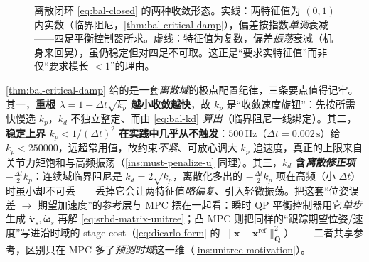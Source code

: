 \begin{figure}[ht]
\centering
{}
\caption{离散闭环 \cref{eq:bal-closed} 的两种收敛形态。实线：两特征值为 $(0,1)$ 内实数（临界阻尼，\cref{thm:bal-critical-damp}），偏差按指数\emph{单调}衰减——四足平衡控制器所求。虚线：特征值为复数，偏差\emph{振荡}衰减（机身来回晃），虽仍稳定但对四足不可取。这正是“要求实特征值”而非仅“要求模长 $<1$”的理由。}
\label{fig:bal-convergence}
\end{figure}

\begin{insight}\label{ins:bal-deadbeat}
\cref{thm:bal-critical-damp} 给的是一套\emph{离散域}的极点配置纪律，三条要点值得记牢。其一，\textbf{重根 $\lambda=1-\Delta t\sqrt{k_p}$ 越小收敛越快}，故 $k_p$ 是“收敛速度旋钮”：先按所需快慢选 $k_p$，$k_d$ 不独立整定、而由 \cref{eq:bal-kd} \emph{算出}（临界阻尼一线绑定）。其二，\textbf{稳定上界 $k_p<1/(\Delta t)^2$ 在实践中几乎从不触发}：$500\,\mathrm{Hz}$（$\Delta t=0.002\,\mathrm{s}$）给 $k_p<250000$，远超常用值，故约束\emph{不紧}、可放心调大 $k_p$ 追速度，真正的上限来自关节力矩饱和与高频振荡（\cref{ins:must-penalize-u} 同理）。其三，\textbf{$k_d$ 含\emph{离散修正项} $-\tfrac{\Delta t}{2}k_p$}：连续域临界阻尼是 $k_d=2\sqrt{k_p}$，离散化多出的 $-\tfrac{\Delta t}{2}k_p$ 项在高频（小 $\Delta t$）时虽小却不可丢——丢掉它会让两特征值\emph{略偏复}、引入轻微振荡。把这套“位姿误差 $\to$ 期望加速度”的参考层与 MPC 摆在一起看：瞬时 QP 平衡控制器用它\emph{单步}生成 $\dot{\boldsymbol{v}}_s,\dot{\boldsymbol{\omega}}_s$ 再解 \cref{eq:srbd-matrix-unitree}；凸 MPC 则把同样的“跟踪期望位姿/速度”写进沿时域的 stage cost（\cref{eq:dicarlo-form} 的 $\|\boldsymbol{x}-\boldsymbol{x}^{\mathrm{ref}}\|_{\mathbf{Q}}^2$）——二者共享参考，区别只在 MPC 多了\emph{预测时域}这一维（\cref{ins:unitree-motivation}）。
\end{insight}

